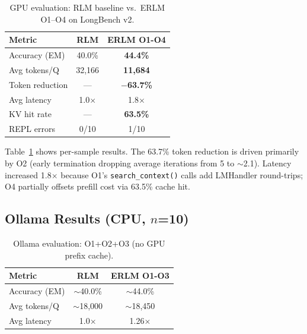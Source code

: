 \documentclass{article}
\begin{document}
\begin{table}[t]
\caption{GPU evaluation: RLM baseline vs.\ ERLM O1--O4 on LongBench v2.}
\label{tab:gpu}
\vskip 0.1in
\begin{center}
\begin{small}
\begin{sc}
\begin{tabular}{lcc}
\toprule
Metric & RLM & ERLM O1-O4 \\
\midrule
Accuracy (EM) & 40.0\% & \textbf{44.4\%} \\
Avg tokens/Q  & 32,166 & \textbf{11,684} \\
Token reduction & --- & \textbf{$-$63.7\%} \\
Avg latency   & 1.0$\times$ & 1.8$\times$ \\
KV hit rate   & --- & \textbf{63.5\%} \\
REPL errors   & 0/10 & 1/10 \\
\bottomrule
\end{tabular}
\end{sc}
\end{small}
\end{center}
\vskip -0.1in
\end{table}

Table~\ref{tab:gpu} shows per-sample results. The 63.7\% token reduction is driven primarily by O2 (early termination dropping average iterations from 5 to $\sim$2.1). Latency increased 1.8$\times$ because O1's \texttt{search\_context()} calls add LMHandler round-trips; O4 partially offsets prefill cost via 63.5\% cache hit.

\subsection{Ollama Results (CPU, $n$=10)}

\begin{table}[t]
\caption{Ollama evaluation: O1+O2+O3 (no GPU prefix cache).}
\label{tab:ollama}
\vskip 0.1in
\begin{center}
\begin{small}
\begin{sc}
\begin{tabular}{lcc}
\toprule
Metric & RLM & ERLM O1-O3 \\
\midrule
Accuracy (EM) & $\sim$40.0\% & $\sim$44.0\% \\
Avg tokens/Q  & $\sim$18,000 & $\sim$18,450 \\
Avg latency   & 1.0$\times$ & 1.26$\times$ \\
\bottomrule
\end{tabular}
\end{sc}
\end{small}
\end{center}
\vskip -0.1in
\end{table}
\end{document}
